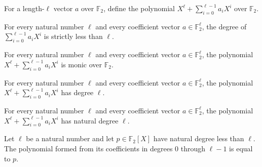 \begin{definition}
\label{FABL.binaryMonicPolynomial}
\leanok
{}
For a length-$\ell$ vector $a$ over $\mathbb{F}_2$, define the polynomial
$X^\ell+\sum_{i=0}^{\ell-1}a_iX^i$ over $\mathbb{F}_2$.
\end{definition}

\begin{theorem}
\label{FABL.binaryLowPolynomial_degree_lt}
\leanok
{}
For every natural number $\ell$ and every coefficient vector $a\in\mathbb F_2^\ell$, the
degree of $\sum_{i=0}^{\ell-1}a_iX^i$ is strictly less than $\ell$.
\end{theorem}

\begin{theorem}
\label{FABL.binaryMonicPolynomial_monic}
\leanok
{}
For every natural number $\ell$ and every coefficient vector $a\in\mathbb{F}_2^\ell$,
the polynomial $X^\ell+\sum_{i=0}^{\ell-1}a_iX^i$ is monic over $\mathbb{F}_2$.
\end{theorem}

\begin{theorem}
\label{FABL.binaryMonicPolynomial_degree}
\leanok
{}
For every natural number $\ell$ and every coefficient vector $a\in\mathbb{F}_2^\ell$,
the polynomial $X^\ell+\sum_{i=0}^{\ell-1}a_iX^i$ has degree $\ell$.
\end{theorem}

\begin{theorem}
\label{FABL.binaryMonicPolynomial_natDegree}
\leanok
{}
For every natural number $\ell$ and every coefficient vector $a\in\mathbb{F}_2^\ell$,
the polynomial $X^\ell+\sum_{i=0}^{\ell-1}a_iX^i$ has natural degree $\ell$.
\end{theorem}

\begin{theorem}
\label{FABL.binaryLowPolynomial_coefficients}
\leanok
{}
Let $\ell$ be a natural number and let $p\in\mathbb F_2[X]$ have natural degree less
than $\ell$. The polynomial formed from its coefficients in degrees $0$ through $\ell-1$
is equal to $p$.
\end{theorem}

